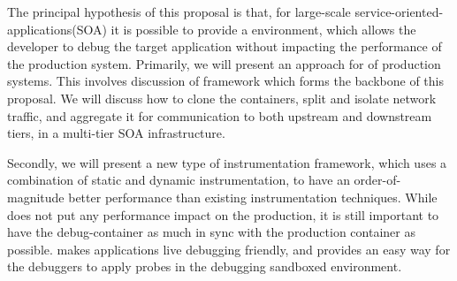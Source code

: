 
The principal hypothesis of this proposal is that, for large-scale service-oriented-applications(SOA) it is possible to provide a \livedebugging environment, which allows the developer to debug the target application without impacting the performance of the production system.
Primarily, we will present an approach for \livedebugging of production systems.
This involves discussion of \parikshan framework which forms the backbone of this proposal.
We will discuss how to clone the containers, split and isolate network traffic, and aggregate it for communication to both upstream and downstream tiers, in a multi-tier SOA infrastructure.

Secondly, we will present \iprobe a new type of instrumentation framework, which uses a combination of static and dynamic instrumentation, to have an order-of-magnitude better performance than existing instrumentation techniques. 
While \livedebugging does not put any performance impact on the production, it is still important to have the debug-container as much in sync with the production container as possible. 
\iprobe makes applications live debugging friendly, and provides an easy way for the debuggers to apply probes in the debugging sandboxed environment.

